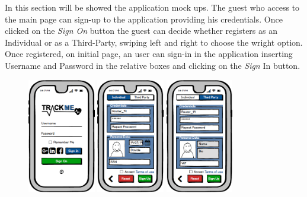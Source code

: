 \documentclass[a4paper]{article}
\begin{document}

In this section will be showed the application mock ups.
\newline
The guest who access to the main page can sign-up to the application providing his credentials. Once clicked on the \textit{Sign On} button the guest can decide whether registers as an Individual or as a Third-Party, swiping left and right to choose the wright option.
\newline
Once registered, on initial page, an user can sign-in in the application inserting Username and Password in the relative boxes and clicking on the \textit{Sign} In button. 
\newline  
\newline  



\begin{figure}[!htpb]
    	\centering
    	\includegraphics[height=50mm]{images/mockups/Login_Registration.png}
    	\includegraphics[height=50mm]{images/mockups/RegistrationForm.png}
    	\includegraphics[height=50mm]{images/mockups/ThirdPartyRegistration.png}
    	\newline
    	\newline
        \end{figure}
        
\end{document}
